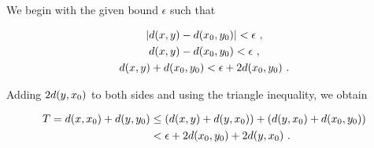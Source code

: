 \begin{frame}
    We begin with the given bound \(\epsilon\) such that

    \begin{gather}
        |d(x, y) - d(x_0, y_0)| < \epsilon~, \nonumber\\
        d(x, y) - d(x_0, y_0) < \epsilon~, \nonumber\\
        d(x, y) +d(x_0, y_0)< \epsilon + 2d(x_0, y_0)~.
    \end{gather}

    \pause

    Adding \(2d(y, x_0)\) to both sides and using the triangle inequality,
    we obtain

    \begin{tcolorbox}[colframe=red, colback=red!10!white]
        \begin{align}
            T = d(x, x_0) + d(y, y_0) &\leq (d(x, y) + d(y, x_0)) + (d(y, x_0)+d(x_0, y_0)) \nonumber\\ 
            &< \epsilon + 2d(x_0, y_0) + 2d(y, x_0)~.
            \label{eqn:tresult}
        \end{align}
    \end{tcolorbox}




\end{frame}

